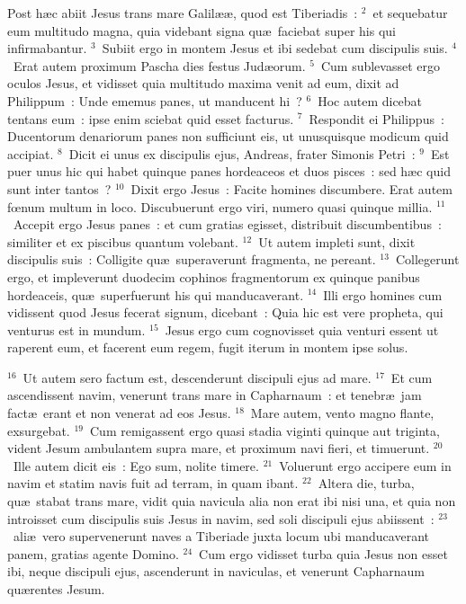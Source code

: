 \lettrine[lines=10,image=true,loversize=0.05,lraise=-0.03]{P}{}ost h\ae c abiit Jesus trans mare Galil\ae \ae , quod est Tiberiadis~:
${}^{2}$~et sequebatur eum multitudo magna, quia videbant signa qu\ae\ faciebat super his qui infirmabantur.
${}^{3}$~Subiit ergo in montem Jesus et ibi sedebat cum discipulis suis.
${}^{4}$~Erat autem proximum Pascha dies festus Jud\ae orum.
${}^{5}$~Cum sublevasset ergo oculos Jesus, et vidisset quia multitudo maxima venit ad eum, dixit ad Philippum~: Unde ememus panes, ut manducent hi~?
${}^{6}$~Hoc autem dicebat tentans eum~: ipse enim sciebat quid esset facturus.
${}^{7}$~Respondit ei Philippus~: Ducentorum denariorum panes non sufficiunt eis, ut unusquisque modicum quid accipiat.
${}^{8}$~Dicit ei unus ex discipulis ejus, Andreas, frater Simonis Petri~:
${}^{9}$~Est puer unus hic qui habet quinque panes hordeaceos et duos pisces~: sed h\ae c quid sunt inter tantos~?
${}^{10}$~Dixit ergo Jesus~: Facite homines discumbere. Erat autem fœnum multum in loco. Discubuerunt ergo viri, numero quasi quinque millia.
${}^{11}$~Accepit ergo Jesus panes~: et cum gratias egisset, distribuit discumbentibus~: similiter et ex piscibus quantum volebant.
${}^{12}$~Ut autem impleti sunt, dixit discipulis suis~: Colligite qu\ae\ superaverunt fragmenta, ne pereant.
${}^{13}$~Collegerunt ergo, et impleverunt duodecim cophinos fragmentorum ex quinque panibus hordeaceis, qu\ae\ superfuerunt his qui manducaverant.
${}^{14}$~Illi ergo homines cum vidissent quod Jesus fecerat signum, dicebant~: Quia hic est vere propheta, qui venturus est in mundum.
${}^{15}$~Jesus ergo cum cognovisset quia venturi essent ut raperent eum, et facerent eum regem, fugit iterum in montem ipse solus.


${}^{16}$~Ut autem sero factum est, descenderunt discipuli ejus ad mare.
${}^{17}$~Et cum ascendissent navim, venerunt trans mare in Capharnaum~: et tenebr\ae\ jam fact\ae\ erant et non venerat ad eos Jesus.
${}^{18}$~Mare autem, vento magno flante, exsurgebat.
${}^{19}$~Cum remigassent ergo quasi stadia viginti quinque aut triginta, vident Jesum ambulantem supra mare, et proximum navi fieri, et timuerunt.
${}^{20}$~Ille autem dicit eis~: Ego sum, nolite timere.
${}^{21}$~Voluerunt ergo accipere eum in navim et statim navis fuit ad terram, in quam ibant.
${}^{22}$~Altera die, turba, qu\ae\ stabat trans mare, vidit quia navicula alia non erat ibi nisi una, et quia non introisset cum discipulis suis Jesus in navim, sed soli discipuli ejus abiissent~:
${}^{23}$~ali\ae\ vero supervenerunt naves a Tiberiade juxta locum ubi manducaverant panem, gratias agente Domino.
${}^{24}$~Cum ergo vidisset turba quia Jesus non esset ibi, neque discipuli ejus, ascenderunt in naviculas, et venerunt Capharnaum qu\ae rentes Jesum.


